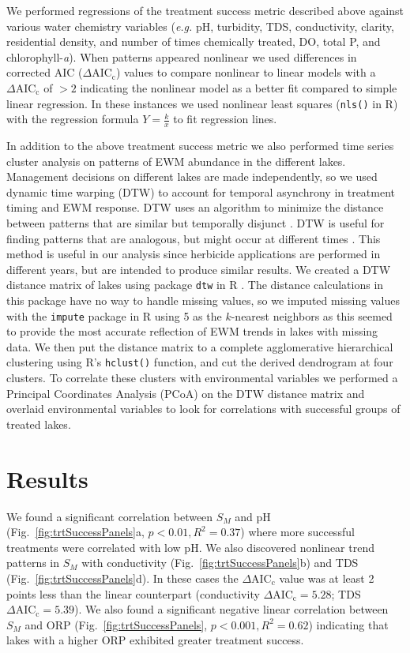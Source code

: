 \documentclass{article}
\begin{document}
We performed regressions of the treatment success metric described above against various water chemistry variables (\emph{e.g.} pH, turbidity, TDS, conductivity, clarity, residential density, and number of times chemically treated, DO, total P, and chlorophyll-\emph{a}). When patterns appeared nonlinear we used differences in corrected AIC ($\Delta\mathrm{AIC_{c}}$) values to compare nonlinear to linear models 
with a $\Delta\mathrm{AIC_{c}}$ of $>2$ indicating the nonlinear model as a better fit compared to simple linear regression. In these instances we used nonlinear least squares (\verb|nls()| in R) with the regression formula $Y=\frac{k}{x}$ to fit regression lines.

In addition to the above treatment success metric we also performed time series cluster analysis on patterns of EWM abundance in the different lakes. 
Management decisions on different lakes are made independently, so we used dynamic time warping (DTW) to account for temporal asynchrony in treatment timing and EWM response. DTW uses an algorithm to minimize the distance between patterns that are similar but temporally disjunct \citep{Berndt1994}. DTW is useful for finding patterns that are analogous, but might occur at different times \citep{Liao2005}. This method is useful in our analysis since herbicide applications are performed in different years, but are intended to produce similar results. We created a DTW distance matrix of lakes using package \verb!dtw! in R \citep{Giorgino2009}. The distance calculations in this package have no way to handle missing values, so we imputed missing values with the \verb!impute! package in R using 5 as the $k$-nearest neighbors \citep{Rimpute} as this seemed to provide the most accurate reflection of EWM trends in lakes with missing data. We then put the distance matrix to a complete agglomerative hierarchical clustering using R's \verb!hclust()! function, and cut the derived dendrogram at four clusters. To correlate these clusters with environmental variables we performed a Principal Coordinates Analysis (PCoA) on the DTW distance matrix and overlaid environmental variables to look for correlations with successful groups of treated lakes.

\vspace{8mm}

\section*{Results}

We found a significant correlation between $S_{M}$ and pH (Fig.~\ref{fig:trtSuccessPanels}a, $p < 0.01, R^2 = 0.37$) where more successful treatments were correlated with low pH. We also discovered nonlinear trend patterns in $S_{M}$ with conductivity (Fig.~\ref{fig:trtSuccessPanels}b) and TDS (Fig.~\ref{fig:trtSuccessPanels}d). In these cases the $\Delta\mathrm{AIC_{c}}$ value was at least 2 points less than the linear counterpart (conductivity $\Delta\mathrm{AIC_{c}} = 5.28$; TDS $\Delta\mathrm{AIC_{c}} = 5.39$). We also found a significant negative linear correlation between $S_{M}$ and ORP (Fig.~\ref{fig:trtSuccessPanels}, $p < 0.001, R^2 = 0.62$) indicating that lakes with a higher ORP exhibited greater treatment success. 
\end{document}
